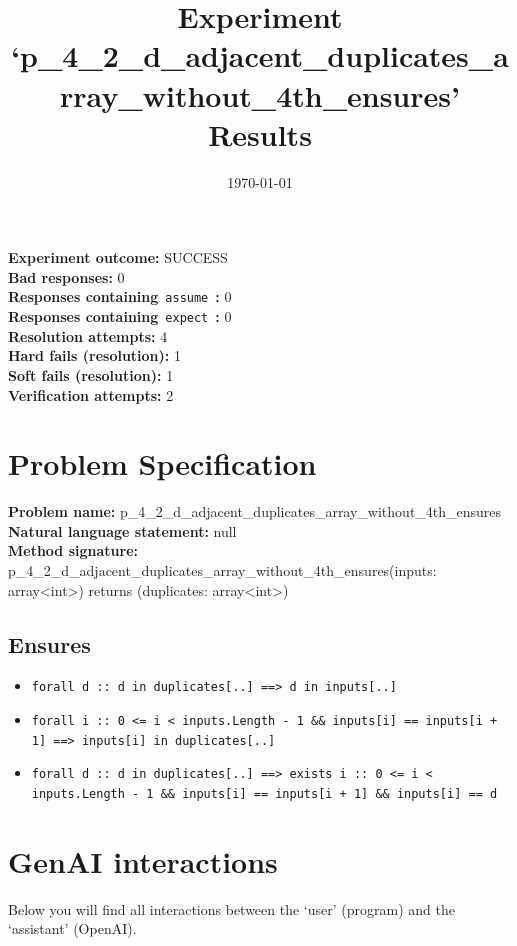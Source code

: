\documentclass{article}
\begin{document}
\title{Experiment `p\_4\_2\_d\_adjacent\_duplicates\_array\_without\_4th\_ensures' Results}
\author{\today}
\date{}
\maketitle
\textbf{Experiment outcome: }SUCCESS
\\\textbf{Bad responses: }0
\\\textbf{Responses containing}~\texttt{assume}~\textbf{: }0
\\\textbf{Responses containing}~\texttt{expect}~\textbf{: }0
\\\textbf{Resolution attempts: }4
\\\textbf{Hard fails (resolution): }1
\\\textbf{Soft fails (resolution): }1
\\\textbf{Verification attempts: }2
\section*{Problem Specification}
\textbf{Problem name: }p\_4\_2\_d\_adjacent\_duplicates\_array\_without\_4th\_ensures
\\\textbf{Natural language statement: }null
\\\textbf{Method signature: }p\_4\_2\_d\_adjacent\_duplicates\_array\_without\_4th\_ensures(inputs: array<int>) returns (duplicates: array<int>)
\subsection*{Ensures}
\begin{itemize}
\item \texttt{forall d :: d in duplicates[..] ==> d in inputs[..]}
\item \texttt{forall i :: 0 <= i < inputs.Length - 1 \&\& inputs[i] == inputs[i + 1] ==> inputs[i] in duplicates[..]}
\item \texttt{forall d :: d in duplicates[..] ==> exists i :: 0 <= i < inputs.Length - 1 \&\& inputs[i] == inputs[i + 1] \&\& inputs[i] == d}
\end{itemize}
\clearpage
\section*{GenAI interactions}
Below you will find all interactions between the `user' (program) and the `assistant' (OpenAI).
\end{document}

